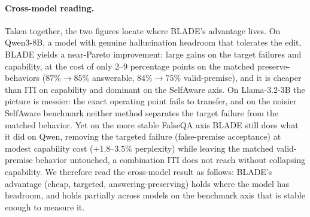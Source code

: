 \paragraph{Cross-model reading.}
Taken together, the two figures locate where BLADE's advantage lives. On
Qwen3-8B, a model with genuine hallucination headroom that tolerates the edit,
BLADE yields a near-Pareto improvement: large gains on the target failures and
capability, at the cost of only $2$--$9$ percentage points on the matched
preserve-behaviors ($87\%\!\to\!85\%$ answerable, $84\%\!\to\!75\%$
valid-premise), and it is cheaper than ITI on capability and dominant on the
SelfAware axis. On Llama-3.2-3B the picture is messier:
the exact operating point fails to transfer, and on the noisier SelfAware
benchmark neither method separates the target failure from the matched
behavior. Yet on the more stable FalseQA axis BLADE still does what it did on
Qwen, removing the targeted failure (false-premise acceptance) at modest
capability cost ($+1.8$--$3.5\%$ perplexity) while leaving the matched
valid-premise behavior untouched, a
combination ITI does not reach without collapsing capability. We therefore
read the cross-model result as follows: BLADE's advantage (cheap, targeted,
answering-preserving) holds where the model has headroom, and holds partially
across models on the benchmark axis that is stable enough to measure it.
